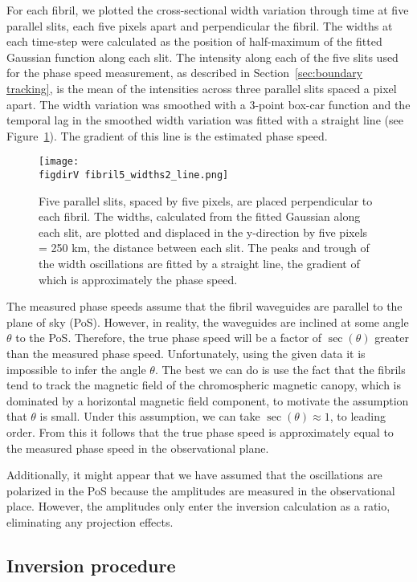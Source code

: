For each fibril, we plotted the cross-sectional width variation through time at five parallel slits, each five pixels apart and perpendicular the fibril. The widths at each time-step were calculated as the position of half-maximum of the fitted Gaussian function along each slit. The intensity along each of the five slits used for the phase speed measurement, as described in Section~\ref{sec:boundary tracking}, is the mean of the intensities across three parallel slits spaced a pixel apart. The width variation was smoothed with a 3-point box-car function and the temporal lag in the smoothed width variation was fitted with a straight line (see Figure~\ref{fig: fibril5_width}). The gradient of this line is the estimated phase speed.

\begin{figure}
	\centering
	\texttt{[image: \\figdirV fibril5\_widths2\_line.png]}
	\caption{Five parallel slits, spaced by five pixels, are placed perpendicular to each fibril. The widths, calculated from the fitted Gaussian along each slit, are plotted and displaced in the y-direction by five pixels = 250 km, the distance between each slit. The peaks and trough of the width oscillations are fitted by a straight line, the gradient of which is approximately the phase speed.}
	\label{fig: fibril5_width}
\end{figure}

The measured phase speeds assume that the fibril waveguides are parallel to the plane of sky (PoS). However, in reality, the waveguides are inclined at some angle $\theta$ to the PoS. Therefore, the true phase speed will be a factor of $\sec(\theta)$ greater than the measured phase speed. Unfortunately, using the given data it is impossible to infer the angle $\theta$. The best we can do is use the fact that the fibrils tend to track the magnetic field of the chromospheric magnetic canopy, which is dominated by a horizontal magnetic field component, to motivate the assumption that $\theta$ is small. Under this assumption, we can take $\sec(\theta) \approx 1$, to leading order. From this it follows that the true phase speed is approximately equal to the measured phase speed in the observational plane.

Additionally, it might appear that we have assumed that the oscillations are polarized in the PoS because the amplitudes are measured in the observational place. However, the amplitudes only enter the inversion calculation as a ratio, eliminating any projection effects.


\subsection{Inversion procedure}\label{sec:inversion}

